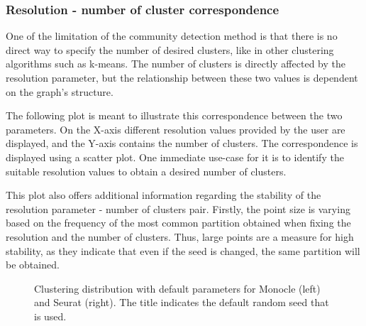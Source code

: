 \subsubsection{Resolution - number of cluster correspondence}
One of the limitation of the community detection method is that there is no direct way to specify the number of desired clusters, like in other clustering algorithms such as k-means. The number of clusters is directly affected by the resolution parameter, but the relationship between these two values is dependent on the graph's structure.

The following plot is meant to illustrate this correspondence between the two parameters. On the X-axis different resolution values provided by the user are displayed, and the Y-axis contains the number of clusters. The correspondence is displayed using a scatter plot. One immediate use-case for it is to identify the suitable resolution values to obtain a desired number of clusters. 

This plot also offers additional information regarding the stability of the resolution parameter - number of clusters pair. Firstly, the point size is varying based on the frequency of the most common partition obtained when fixing the resolution and the number of clusters. Thus, large points are a measure for high stability, as they indicate that even if the seed is changed, the same partition will be obtained.

\begin{figure}[H]
    \centering
    \caption{\label{fig:ca-1-kres}Clustering distribution with default parameters for Monocle (left) and Seurat (right). The title indicates the default random seed that is used.}
\end{figure}

